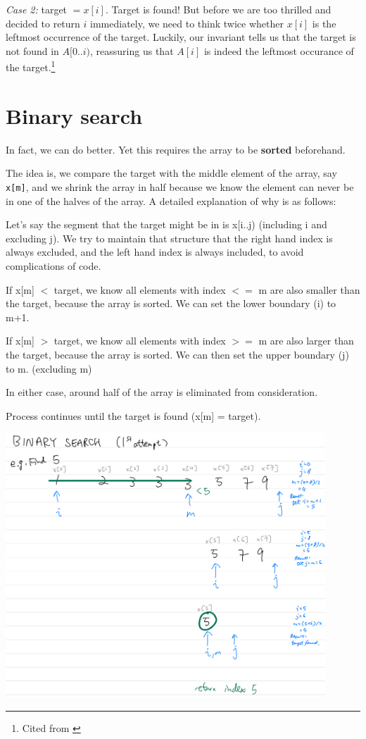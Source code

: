 \textit{Case 2:} target $ = x[i]$. Target is found! But before we are too thrilled and decided to return $i$ immediately, we need to think twice whether $x[i]$ is the leftmost occurrence of the target. Luckily, our invariant tells us that the target is not found in $A[0..i)$, reassuring us that $A[i]$ is indeed the leftmost occurance of the target.\footnote{Cited from \cite{ip:inv}}

\fi
\pagebreak

\section{Binary search}

In fact, we can do better. Yet this requires the array to be \textbf{sorted} beforehand.

The idea is, we compare the target with the middle element of the array, say \texttt{x[m]}, and we shrink the array in half because we know the element can never be in one of the halves of the array. A detailed explanation of why is as follows:


Let's say the segment that the target might be in is x[i..j) (including i and excluding j). We try to maintain that structure that the right hand index is always excluded, and the left hand index is always included, to avoid complications of code.


If x[m] $<$ target, we know all elements with index $<=$ m are also smaller than the target, because the array is sorted. We can set the lower boundary (i) to m+1.

If x[m] $>$ target, we know all elements with index $>=$ m are also larger than the target, because the array is sorted. We can then set the upper boundary (j) to m. (excluding m)


In either case, around half of the array is eliminated from consideration.

Process continues until the target is found (x[m] = target).
\vspace{3mm}

\includegraphics[width=12cm]{images/ch7-binarysearch1.png}
\pagebreak

